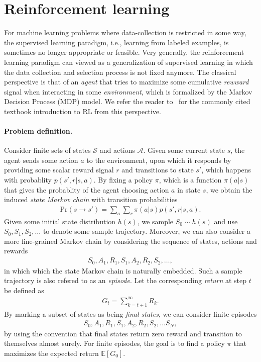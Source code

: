 \documentclass[a4paper]{report}
\theoremstyle{definition}
\theoremstyle{plain}
\begin{document}
\section{Reinforcement learning}

For machine learning problems where data-collection is restricted in some way,
the supervised learning paradigm, i.e., learning from labeled examples, is
sometimes no longer appropriate or feasible.
%
Very generally, the reinforcement learning paradigm can viewed as a
generalization of supervised learning in which the data collection and selection
process is not fixed anymore.
%
The classical perspective is that of an \emph{agent} that tries to maximize some
cumulative \emph{rewward} signal when interacting in some \emph{environment},
which is formalized by the Markov Decision Process (MDP) model.
%
We refer the reader to~\cite{suttonReinforcementLearningIntroduction2018} for the commonly cited textbook introduction to RL
from this perspective.

\paragraph{Problem definition.}
Consider finite sets of states $\mathcal{S}$ and actions $\mathcal{A}$.
%
Given some current state $s$, the agent sends some action $a$ to the
environment, upon which it responds by providing some scalar reward signal $r$
and transitions to state $s'$, which happens with probablity $p(s', r | s, a)$.
%
By fixing a policy $\pi$, which is a function $\pi(a|s)$ that gives the
probablity of the agent choosing action $a$ in state $s$, we obtain the induced
\emph{state Markov chain} with transition probabilities
%
\begin{align*}
  \mathrm{Pr}(s \rightarrow s') = \sum_{a} \sum_{r} \pi(a|s) p(s', r | s, a) .
\end{align*}
Given some initial state distribution $h(s)$, we sample $S_{0} \sim h(s)$ and
use $S_{0}, S_{1}, S_{2}, \dots$ to denote some sample trajectory.
%
Moreover, we can also consider a more fine-grained Markov chain by considering
the sequence of states, actions and rewards
\begin{align*}
  S_{0}, A_{1}, R_{1}, S_{1}, A_{2}, R_{2}, S_{2}, \dots ,
\end{align*}
in which which the state Markov chain is naturally embedded. Such a sample
trajectory is also refered to as an \emph{episode}.
%
Let the corresponding \emph{return} at step $t$ be
defined as
\begin{align*}
  G_{t} = \sum_{k=t+1}^{\infty} R_{k} .
\end{align*}
By marking a subset of states as being \emph{final states}, we can consider finite episodes
\begin{align*}
  S_{0}, A_{1}, R_{1}, S_{1}, A_{2}, R_{2}, S_{2}, \dots S_{N},
\end{align*}
by using the convention that final states return zero reward and transition to
themselves almost surely.
%
For finite episodes, the goal is to find a policy $\pi$ that maximizes the
expected return $\mathbb{E}[G_{0}]$.
\end{document}
